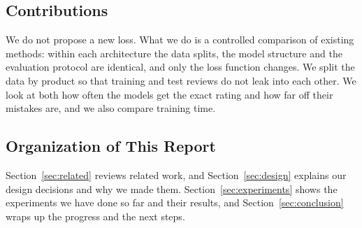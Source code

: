 \subsection{Contributions}
We do not propose a new loss. What we do is a controlled comparison of existing methods: within each architecture the data splits, the model structure and the evaluation protocol are identical, and only the loss function changes. We split the data by product so that training and test reviews do not leak into each other. We look at both how often the models get the exact rating and how far off their mistakes are, and we also compare training time.

\subsection{Organization of This Report}
Section~\ref{sec:related} reviews related work, and Section~\ref{sec:design} explains our design decisions and why we made them. Section~\ref{sec:experiments} shows the experiments we have done so far and their results, and Section~\ref{sec:conclusion} wraps up the progress and the next steps.
